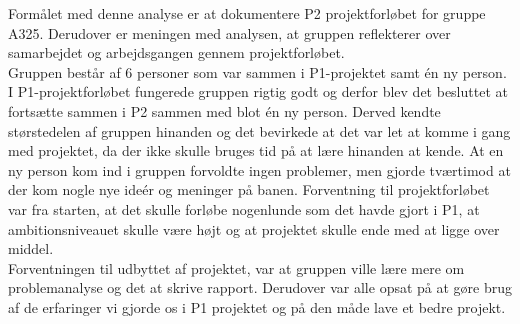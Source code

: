 Formålet med denne analyse er at dokumentere P2 projektforløbet for gruppe A325. Derudover er meningen med analysen, at gruppen reflekterer over samarbejdet og arbejdsgangen gennem projektforløbet.
\\
Gruppen består af 6 personer som var sammen i P1-projektet samt én ny person. I P1-projektforløbet fungerede gruppen rigtig godt og derfor blev det besluttet at fortsætte sammen i P2 sammen med blot én ny person. Derved kendte størstedelen af gruppen hinanden og det bevirkede at det var let at komme i gang med projektet, da  der ikke skulle bruges tid på at lære hinanden at kende. At en ny person kom ind i gruppen forvoldte ingen problemer, men gjorde tværtimod at der kom nogle nye ideér og meninger på banen. Forventning til projektforløbet var fra starten, at det skulle forløbe nogenlunde som det havde gjort i P1, at ambitionsniveauet skulle være højt og at projektet skulle ende med at ligge over middel. 
\\
Forventningen til udbyttet af projektet, var at gruppen ville lære mere om problemanalyse og det at skrive rapport. Derudover var alle opsat på at gøre brug af de erfaringer vi gjorde os i P1 projektet og på den måde lave et bedre projekt. 
